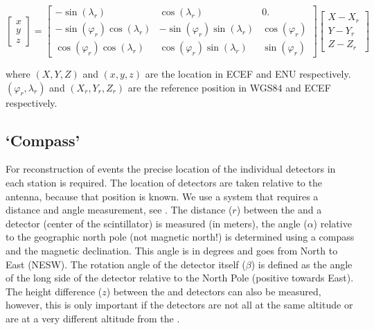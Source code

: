 \begin{equation}
    \begin{bmatrix}
        x \\
        y \\
        z
    \end{bmatrix}
    =
    \begin{bmatrix}
                        -\sin(\lambda_r) &                  \cos(\lambda_r) &              0. \\
        -\sin(\varphi_r) \cos(\lambda_r) & -\sin(\varphi_r) \sin(\lambda_r) & \cos(\varphi_r) \\
         \cos(\varphi_r) \cos(\lambda_r) &  \cos(\varphi_r) \sin(\lambda_r) & \sin(\varphi_r)
    \end{bmatrix}
    \begin{bmatrix}
        X - X_r \\
        Y - Y_r \\
        Z - Z_r
    \end{bmatrix}
\end{equation}

\noindent where $(X, Y, Z)$ and $(x, y, z)$ are the location in ECEF and
ENU respectively. $(\varphi_r, \lambda_r)$ and $(X_r, Y_r, Z_r)$ are the
reference position in WGS84 and ECEF respectively.


\subsection{`Compass'}

For reconstruction of events the precise location of the individual
detectors in each station is required. The location of detectors are
taken relative to the \gps antenna, because that position is known. We
use a system that requires a distance and angle measurement, see
. The distance ($r$) between the \gps and a
detector (center of the scintillator) is measured (in meters), the angle
($\alpha$) relative to the geographic north pole (not magnetic north!)
is determined using a compass and the magnetic declination. This angle
is in degrees and goes from North to East (NESW). The rotation angle of
the detector itself ($\beta$) is defined as the angle of the long side
of the detector relative to the North Pole (positive towards East). The
height difference ($z$) between the \gps and detectors can also be
measured, however, this is only important if the detectors are not all
at the same altitude or are at a very different altitude from the \gps.

